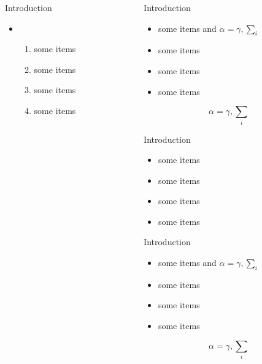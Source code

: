 \documentclass[final]{beamer}\usepackage[]{graphicx}\usepackage[]{color}
\begin{document}
\begin{frame}{}
\begin{columns}[t]
\begin{column}{.48\linewidth}
\begin{block}{Introduction}
          \begin{itemize}
          \item[]
            \begin{enumerate}
            \item some items
            \item some items
            \item some items
            \item some items
            \end{enumerate}
          \end{itemize}
        \end{block}
      \end{column}
      \begin{column}{.48\linewidth}
        \begin{block}{Introduction}
          \begin{itemize}
          \item some items and $\alpha=\gamma, \sum_{i}$
          \item some items
          \item some items
          \item some items
          \end{itemize}
          $$\alpha=\gamma, \sum_{i}$$
        \end{block}

        \begin{block}{Introduction}
          \begin{itemize}
          \item some items
          \item some items
          \item some items
          \item some items
          \end{itemize}
        \end{block}

        \begin{exampleblock}{Introduction}
          \begin{itemize}
          \item some items and $\alpha=\gamma, \sum_{i}$
          \item some items
          \item some items
          \item some items
          \end{itemize}
          $$\alpha=\gamma, \sum_{i}$$
        \end{exampleblock}
      \end{column}
    \end{columns}
  \end{frame}
\end{document}
